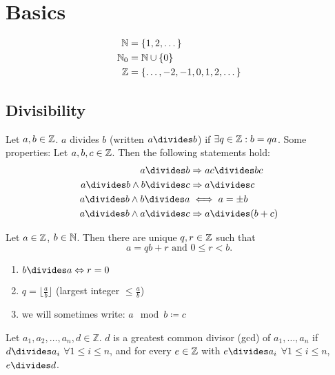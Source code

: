 \documentclass[NumTh.tex]{subfiles}
\begin{document}
\section{Basics}

\begin{align}
  \mathbb{N} &= \{1,2,\dots\} \\
  \mathbb{N}_0 &= \mathbb{N} \cup \{0\}\\
  \mathbb{Z} &= \{ \dots,-2,-1,0,1,2,\dots\}
\end{align}

\subsection{Divisibility}
\begin{defi}\label{def_0_1_1}
Let $a,b \in \mathbb{Z}$. $a$ divides $b$ (written $a\divides b$) if $\exists q \in \mathbb{Z} : b = qa$.
\newline
Some properties: Let $a,b,c \in \mathbb{Z}$. Then the following statements hold:
\begin{align}
  a\divides b &\Rightarrow ac\divides bc \\
  a\divides b \land b\divides c &\Rightarrow a\divides c \\
  a\divides b \land b\divides a &\iff a = \pm b \\
  a\divides b \land a\divides c &\Rightarrow a\divides (b+c)
\end{align}
\end{defi}

\begin{theorem}\label{th_0_1_2}
Let $a \in \mathbb{Z}$, $b \in \mathbb{N}$. Then there are unique $q,r \in \mathbb{Z}$ such that
\[a = qb + r \text{ and } 0 \leq r < b.\]
\end{theorem}

\begin{rem}
\begin{enumerate}
  \item $b\divides a \Leftrightarrow r = 0$
  \item $q = \lfloor \frac{a}{b} \rfloor$ (largest integer $\leq \frac{a}{b}$)
  \item we will sometimes write: $a \mod b \coloneq c$
\end{enumerate}
\end{rem}

\begin{defi}\label{def_0_1_3}
Let $a_1,a_2,\dots,a_n,d \in \mathbb{Z}$. $d$ is a greatest common divisor (gcd) of $a_1,\dots,a_n$ if
$d\divides a_i$ $\forall 1\leq i \leq n$,
and for every $e \in \mathbb{Z}$ with $e\divides a_i$ $\forall 1\leq i \leq n$, $e\divides d$.
\end{defi}
\end{document}

